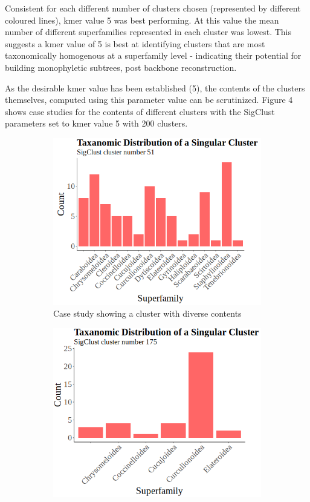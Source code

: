 \documentclass[12pt]{article}
\begin{document}
  Consistent for each different number of clusters chosen (represented by different coloured lines), kmer value 5 was best performing. At this value the mean number of different superfamilies represented in each cluster was lowest. This suggests a kmer value of 5 is best at identifying clusters that are most taxonomically homogenous at a superfamily level - indicating their potential for building monophyletic subtrees, post backbone reconstruction.

  As the desirable kmer value has been established (5), the contents of the clusters themselves, computed using this parameter value can be scrutinized. Figure 4 shows case studies for the contents of different clusters with the SigClust parameters set to kmer value 5 with 200 clusters.

  \begin{figure}[H]
    \centering
    \begin{subfigure}{0.495\textwidth}
      \includegraphics[width=\linewidth]{cluster_51.png}
      \caption{Case study showing a cluster with diverse contents}
    \end{subfigure}
    \begin{subfigure}{0.486\textwidth}
      \includegraphics[width=\linewidth]{cluster_175.png}

\end{subfigure}
\end{figure}
\end{document}
